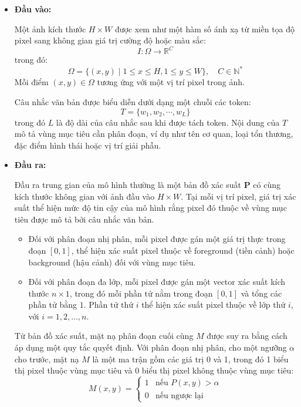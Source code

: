 \begin{itemize}
    \item \textbf{Đầu vào:}

    Một ảnh kích thước $H \times W$ được xem như một hàm số ánh xạ từ miền tọa độ pixel sang không gian giá trị cường độ hoặc màu sắc:
    \[
        I: \Omega \rightarrow \mathbb{R}^C
    \]
    trong đó:
    \[
        \Omega = \{(x, y) \mid 1 \le x \le H, 1 \le y \le W\}, \quad C \in \mathbb{N^*}
    \]
    Mỗi điểm $(x,y) \in \Omega$ tương ứng với một vị trí pixel trong ảnh.

    Câu nhắc văn bản được biểu diễn dưới dạng một chuỗi các token:
    \[
        T = \{w_1, w_2, \cdots, w_L\}
    \]
    trong đó $L$ là độ dài của câu nhắc sau khi được tách token. Nội dung của $T$ mô tả vùng mục tiêu cần phân đoạn, ví dụ như tên cơ quan, loại tổn thương, đặc điểm hình thái hoặc vị trí giải phẫu.

    \item \textbf{Đầu ra:}

    Đầu ra trung gian của mô hình thường là một bản đồ xác suất $\mathbf{P}$ có cùng kích thước không gian với ảnh đầu vào $H \times W$. Tại mỗi vị trí pixel, giá trị xác suất thể hiện mức độ tin cậy của mô hình rằng pixel đó thuộc về vùng mục tiêu được mô tả bởi câu nhắc văn bản.

        \begin{itemize}
            \item Đối với phân đoạn nhị phân, mỗi pixel được gán một giá trị thực trong đoạn $[0,1]$, thể hiện xác suất pixel thuộc về foreground (tiền cảnh) hoặc background (hậu cảnh) đối với vùng mục tiêu.
            \item Đối với phân đoạn đa lớp, mỗi pixel được gán một vector xác suất kích thước $n \times 1$, trong đó mỗi phần tử nằm trong đoạn $[0,1]$ và tổng các phần tử bằng $1$. Phần tử thứ $i$ thể hiện xác suất pixel thuộc về lớp thứ $i$, với $i = 1, 2, \dots, n$.
        \end{itemize}

    Từ bản đồ xác suất, mặt nạ phân đoạn cuối cùng $M$ được suy ra bằng cách áp dụng một quy tắc quyết định. Với phân đoạn nhị phân, cho một ngưỡng $\alpha$ cho trước, mặt nạ $M$ là một ma trận gồm các giá trị 0 và 1, trong đó 1 biểu thị pixel thuộc vùng mục tiêu và 0 biểu thị pixel không thuộc vùng mục tiêu:
    \[
    M(x, y) =
        \begin{cases}
        1 & \text{nếu } P(x,y) > \alpha \\
        0 & \text{nếu ngược lại}
        \end{cases}
    \]


\end{itemize}
